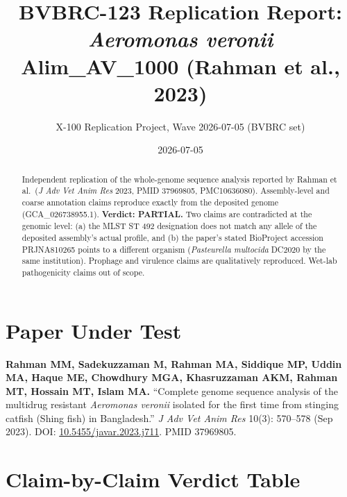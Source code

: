 \documentclass[10pt]{article}
\title{BVBRC-123 Replication Report:\\ \textit{Aeromonas veronii} Alim\_AV\_1000 (Rahman et al., 2023)}
\author{X-100 Replication Project, Wave 2026-07-05 (BVBRC set)}
\date{2026-07-05}
\begin{document}
\maketitle

\begin{abstract}
Independent replication of the whole-genome sequence analysis reported by Rahman et al.\ (\textit{J Adv Vet Anim Res} 2023, PMID 37969805, PMC10636080). Assembly-level and coarse annotation claims reproduce exactly from the deposited genome (GCA\_026738955.1). \textbf{Verdict: PARTIAL.} Two claims are contradicted at the genomic level: (a) the MLST ST 492 designation does not match any allele of the deposited assembly's actual profile, and (b) the paper's stated BioProject accession PRJNA810265 points to a different organism (\textit{Pasteurella multocida} DC2020 by the same institution). Prophage and virulence claims are qualitatively reproduced. Wet-lab pathogenicity claims out of scope.
\end{abstract}

\section{Paper Under Test}
\textbf{Rahman MM, Sadekuzzaman M, Rahman MA, Siddique MP, Uddin MA, Haque ME, Chowdhury MGA, Khasruzzaman AKM, Rahman MT, Hossain MT, Islam MA.} ``Complete genome sequence analysis of the multidrug resistant \textit{Aeromonas veronii} isolated for the first time from stinging catfish (Shing fish) in Bangladesh.'' \textit{J Adv Vet Anim Res} 10(3): 570--578 (Sep 2023). DOI: \href{https://doi.org/10.5455/javar.2023.j711}{10.5455/javar.2023.j711}. PMID 37969805.

\section{Claim-by-Claim Verdict Table}
\end{document}

